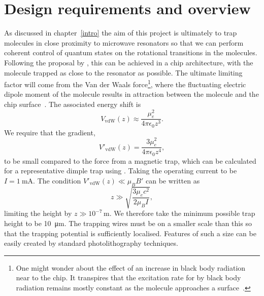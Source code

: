 \section{Design requirements and overview}
\label{overview:design}

As discussed in chapter~\ref{intro} the aim of this project is ultimately to
trap molecules in close proximity to microwave resonators so that we can
perform coherent control of quantum states on the rotational transitions in the
molecules.
%
Following the proposal by , this can be achieved in a chip
architecture, with the molecule trapped as close to the resonator as possible.
%
The ultimate limiting factor will come from the Van der Waals force\footnote{
  One might wonder about the effect of an increase in black body radiation near
  to the chip.  It transpires that the excitation rate for \CaF{} by black body
  radiation remains mostly constant as the molecule approaches a
  surface~\cite{PhysRevA.78.052901}.
}, where the fluctuating electric dipole moment of the molecule results in
attraction between the molecule and the chip surface~\cite{2011Ac}. The
associated energy shift is 
%
\begin{equation}
  V_\text{vdW}(z) \approx \frac{\mu_e^2}{4\pi\epsilon_0 z^3}.
\end{equation}
%
We require that the gradient,
%
\begin{equation}
V'_\text{vdW}(z) = \frac{3 \mu_e^2}{4 \pi\epsilon_0 z^4},
\end{equation}
%
to be small compared to the force from a magnetic trap, which can be calculated
for a representative dimple trap using . Taking the
operating current to be $I = \SI{1}{\milli\ampere}$. The condition
$V'_\text{vdW}(z) \ll \mu_B B'$ can be written as
%
\begin{equation}
  z \gg \sqrt{\frac{3 \mu_e c^2}{2 \mu_B I}},
\end{equation}
%
limiting the height by $z \gg 10^{-7}\,\si{\meter}$. We therefore take the
minimum possible trap height to be \SI{10}{\micro\meter}. The trapping wires
must be on a smaller scale than this so that the trapping potential is
sufficiently localised. Features of such a size can be easily created by
standard photolithography techniques.


